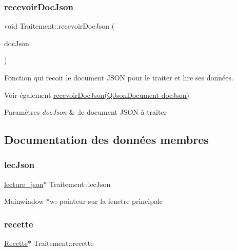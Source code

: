 \subsubsection{\texorpdfstring{recevoir\+Doc\+Json}{recevoirDocJson}}
{\footnotesize\ttfamily void Traitement\+::recevoir\+Doc\+Json (\begin{DoxyParamCaption}\item[{Q\+Json\+Document}]{doc\+Json }\end{DoxyParamCaption})\hspace{0.3cm}{\ttfamily [slot]}}



Fonction qui recoit le document J\+S\+ON pour le traiter et lire ses données. 

\begin{DoxySeeAlso}{Voir également}
\hyperlink{classTraitement_a7bbc7e2034b55a9de14c010be7d3de11}{recevoir\+Doc\+Json(\+Q\+Json\+Document doc\+Json)} 
\end{DoxySeeAlso}

\begin{DoxyParams}{Paramètres}
{\em doc\+Json} & \+:le document J\+S\+ON à traiter \\
\hline
\end{DoxyParams}


\subsection{Documentation des données membres}
\mbox{\label{classTraitement_ac7e6ff3bfc54975b1c8831a2ad8fc9a4}} 
\subsubsection{\texorpdfstring{lec\+Json}{lecJson}}
{\footnotesize\ttfamily \hyperlink{classlecture__json}{lecture\+\_\+json}$\ast$ Traitement\+::lec\+Json\hspace{0.3cm}{\ttfamily [private]}}

Mainwindow $\ast$w\+: pointeur sur la fenetre principale \mbox{\label{classTraitement_afc8ac78bded6d17a86323544aa00d91b}} 
\subsubsection{\texorpdfstring{recette}{recette}}
{\footnotesize\ttfamily \hyperlink{classRecette}{Recette}$\ast$ Traitement\+::recette\hspace{0.3cm}{\ttfamily [private]}}

